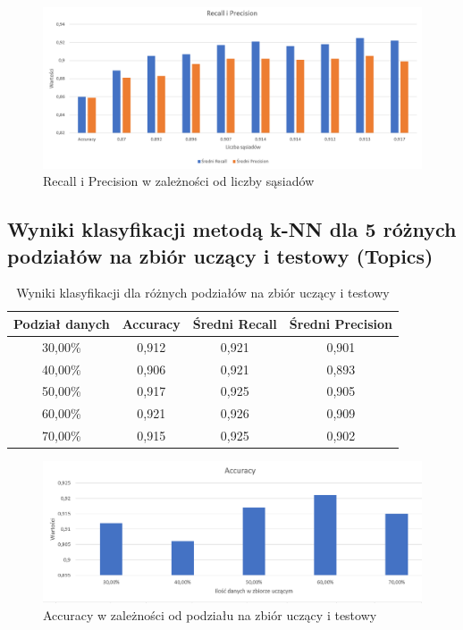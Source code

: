 \documentclass{classrep}
\begin{document}
{\begin{figure}[H]
\caption{Recall i Precision w zależności od liczby sąsiadów}
\centering
\includegraphics[width=1\textwidth]{i8}
\end{figure}

\subsection{Wyniki klasyfikacji metodą k-NN dla 5 różnych podziałów na zbiór uczący i testowy (Topics)}

\begin{table}[h]
\begin{center}
\caption{Wyniki klasyfikacji dla różnych podziałów na zbiór uczący i testowy}
\begin{tabular}{|c|c|c|c|}
\hline
\textbf{Podział danych} & \textbf{Accuracy} & \textbf{Średni Recall} & \textbf{Średni Precision} \\ \hline
30,00\%                 & 0,912             & 0,921                  & 0,901                     \\ \hline
40,00\%                 & 0,906             & 0,921                  & 0,893                     \\ \hline
50,00\%                 & 0,917             & 0,925                  & 0,905                     \\ \hline
60,00\%                 & 0,921             & 0,926                  & 0,909                     \\ \hline
70,00\%                 & 0,915             & 0,925                  & 0,902                     \\ \hline
\end{tabular}
\end{center}
\end{table}


\begin{figure}[H]
\caption{Accuracy w zależności od podziału na zbiór uczący i testowy}
\centering
\includegraphics[width=1\textwidth]{i11}
\end{figure}

}
\end{document}
